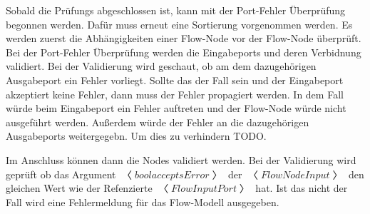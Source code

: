 \documentclass{article}
\begin{document}
    Sobald die Prüfungs abgeschlossen ist, kann mit der Port-Fehler Überprüfung begonnen werden.
    Dafür muss erneut eine Sortierung vorgenommen werden. Es werden zuerst die Abhängigkeiten einer Flow-Node vor der Flow-Node überprüft.
    Bei der Port-Fehler Überprüfung werden die Eingabeports und deren Verbidnung validiert.
    Bei der Validierung wird geschaut, ob am dem dazugehörigen Ausgabeport ein Fehler vorliegt. Sollte das der Fall sein und der Eingabeport akzeptiert keine Fehler, dann muss der Fehler propagiert werden.
    In dem Fall würde beim Eingabeport ein Fehler auftreten und der Flow-Node würde nicht ausgeführt werden. Außerdem würde der Fehler an die dazugehörigen Ausgabeports weitergegebn.
    Um dies zu verhindern TODO.

    Im Anschluss können dann die Nodes validiert werden. 
    Bei der Validierung wird geprüft ob das Argument $〈bool acceptsError〉$ der $〈FlowNodeInput〉$ den gleichen Wert wie der Refenzierte $〈FlowInputPort〉$ hat. Ist das nicht der Fall wird eine Fehlermeldung für das Flow-Modell ausgegeben.
\end{document}
